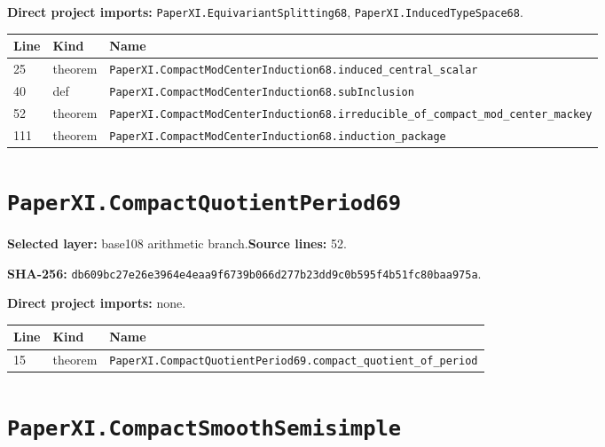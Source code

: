 \documentclass[10pt,oneside]{book}
\begin{document}
\textbf{Direct project imports:} \nolinkurl{PaperXI.EquivariantSplitting68}, \nolinkurl{PaperXI.InducedTypeSpace68}.

\begin{longtable}{@{}p{}p{}p{}@{}}\toprule Line&Kind&Name\\\midrule\endhead

25&theorem&\nolinkurl{PaperXI.CompactModCenterInduction68.induced_central_scalar}\\

40&def&\nolinkurl{PaperXI.CompactModCenterInduction68.subInclusion}\\

52&theorem&\nolinkurl{PaperXI.CompactModCenterInduction68.irreducible_of_compact_mod_center_mackey}\\

111&theorem&\nolinkurl{PaperXI.CompactModCenterInduction68.induction_package}\\

\bottomrule\end{longtable}

\section{\texorpdfstring{\nolinkurl{PaperXI.CompactQuotientPeriod69}}{PaperXI.CompactQuotientPeriod69}}\label{module:PaperXI.CompactQuotientPeriod69}

\textbf{Selected layer:} base108 arithmetic branch.\quad\textbf{Source lines:} 52.\par\textbf{SHA-256:} {\scriptsize\nolinkurl{db609bc27e26e3964e4eaa9f6739b066d277b23dd9c0b595f4b51fc80baa975a}}.


\textbf{Direct project imports:} none.

\begin{longtable}{@{}p{}p{}p{}@{}}\toprule Line&Kind&Name\\\midrule\endhead

15&theorem&\nolinkurl{PaperXI.CompactQuotientPeriod69.compact_quotient_of_period}\\

\bottomrule\end{longtable}

\section{\texorpdfstring{\nolinkurl{PaperXI.CompactSmoothSemisimple}}{PaperXI.CompactSmoothSemisimple}}\label{module:PaperXI.CompactSmoothSemisimple}
\end{document}
